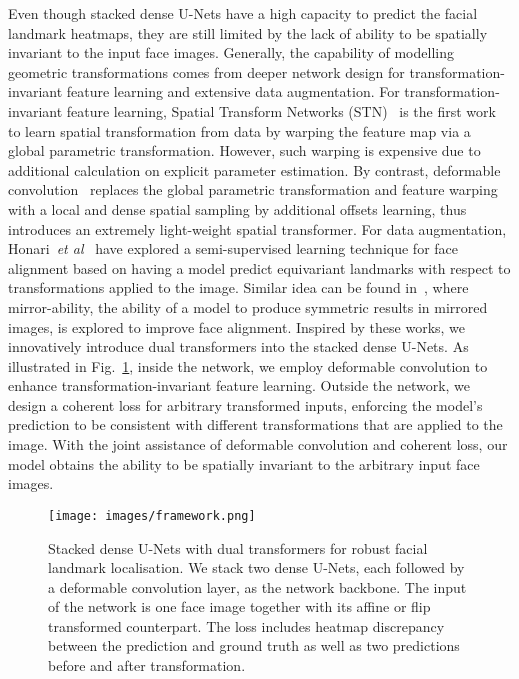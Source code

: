 \documentclass{bmvc2k}
\def\etal{\emph{et al}\bmvaOneDot}
\begin{document}
Even though stacked dense U-Nets have a high capacity to predict the facial landmark heatmaps, they are still limited by the lack of ability to be spatially invariant to the input face images. Generally, the capability of modelling geometric transformations comes from deeper network design for transformation-invariant feature learning and extensive data augmentation. For transformation-invariant feature learning, Spatial Transform Networks (STN)~\cite{jaderberg2015spatial} is the first work to learn spatial transformation from data by warping the feature map via a global parametric transformation. However, such warping is expensive due to additional calculation on explicit parameter estimation. By contrast, deformable convolution~\cite{dai2017deformable} replaces the global parametric transformation and feature warping with a local and dense spatial sampling by additional offsets learning, thus introduces an extremely light-weight spatial transformer. For data augmentation, Honari~\etal~\cite{honari2017improving} have explored a semi-supervised learning technique for face alignment based on having a model predict equivariant landmarks with respect to transformations applied to the image. Similar idea can be found in~\cite{yang2015mirror}, where mirror-ability, the ability of a model to produce symmetric results in mirrored images, is explored to improve face alignment. Inspired by these works, we innovatively introduce dual transformers into the stacked dense U-Nets. As illustrated in Fig.~\ref{pic:framework}, inside the network, we employ deformable convolution to enhance transformation-invariant feature learning. Outside the network, we design a coherent loss for arbitrary transformed inputs, enforcing the model's prediction to be consistent with different transformations that are applied to the image. With the joint assistance of deformable convolution and coherent loss, our model obtains the ability to be spatially invariant to the arbitrary input face images.

\begin{figure}[t]
\begin{center}
\texttt{[image: images/framework.png]}\\
\end{center}
\vspace{-2mm}
\caption{Stacked dense U-Nets with dual transformers for robust facial landmark localisation. We stack two dense U-Nets, each followed by a deformable convolution layer, as the network backbone. The input of the network is one face image together with its affine or flip transformed counterpart. The loss includes heatmap discrepancy between the prediction and ground truth as well as two predictions before and after transformation.}
\label{pic:framework}
\vspace{-2mm}
\end{figure}
\end{document}
